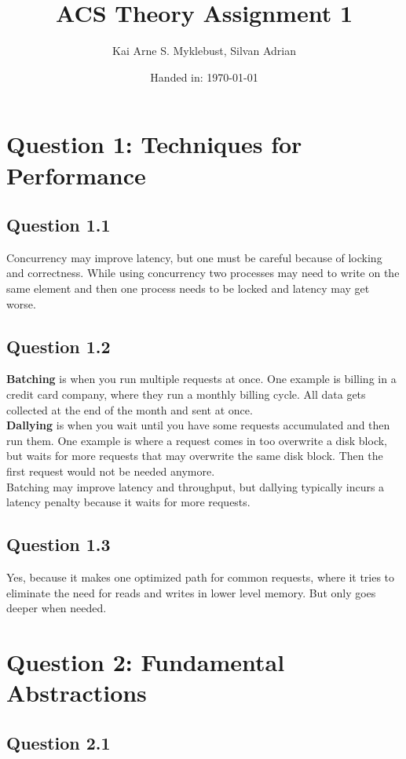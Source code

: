\documentclass[12pt,a4paper]{article}
\begin{document}
\title{ACS Theory Assignment 1}
\subtitle{}

\author{Kai Arne S. Myklebust, Silvan Adrian}
\date{Handed in: \today}
	
\maketitle
\tableofcontents

\section{Question 1: Techniques for Performance}
\subsection{Question 1.1}
Concurrency may improve latency, but one must be careful because of locking and correctness. While using concurrency two processes may need to write on the same element and then one process needs to be locked and latency may get worse.
\subsection{Question 1.2}
\textbf{Batching} is when you run multiple requests at once. One example is billing in a credit card company, where they run a monthly billing cycle. All data gets collected at the end of the month and sent at once. \\
\textbf{Dallying} is when you wait until you have some requests accumulated and then run them. One example is where a request comes in too overwrite a disk block, but waits for more requests that may overwrite the same disk block. Then the first request would not be needed anymore. \\
Batching may improve latency and throughput, but dallying typically incurs a latency penalty because it waits for more requests.
\subsection{Question 1.3}
Yes, because it makes one optimized path for common requests, where it tries to eliminate the need for reads and writes in lower level memory. But only goes deeper when needed.

\section{Question 2: Fundamental Abstractions}
\subsection{Question 2.1}
\end{document}
